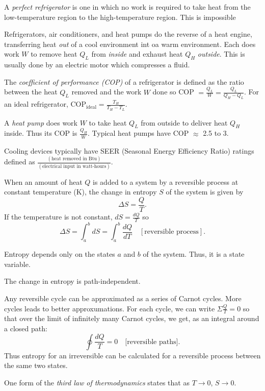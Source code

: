\begin{definition}
    A \emph{perfect refrigerator} is one in which no work is required to take heat from the low-temperature region to the high-temperature region. This is impossible
\end{definition}
\begin{remark}
    Refrigerators, air conditioners, and heat pumps do the reverse of a heat engine, transferring heat \emph{out} of a cool environment int oa warm environment. Each does work $W$ to remove heat $Q_L$ from \emph{inside} and exhaust heat $Q_H$ \emph{outside}. This is usually done by an electric motor which compresses a fluid.
\end{remark}
\begin{definition}
    The \emph{coefficient of performance (COP)} of a refrigerator is defined as the ratio between the heat $Q_L$ removed and the work $W$ done so COP $=\frac{Q_L}{W} = \frac{Q_L}{Q_H-Q_L}$. For an ideal refrigerator, $\text{COP}_{\text{ideal}} = \frac{T_H}{T_H-T_L}.$
\end{definition}
\begin{definition}
    A \emph{heat pump} does work $W$ to take heat $Q_L$ from outside to deliver heat $Q_H$ inside. Thus its COP is $\frac{Q_H}{W}$. Typical heat pumps have COP $\approx$ 2.5 to 3.
\end{definition}
\begin{remark}
    Cooling devices typically have SEER (Seasonal Energy Efficiency Ratio) ratings defined as $\frac{(\text{heat removed in Btu})}{(\text{electrical input in watt-hours})}$.
\end{remark}
\begin{definition}[Entropy]
    When an amount of heat $Q$ is added to a system by a reversible process at constant temperature (K), the change in entropy $S$ of the system is given by $$\Delta S= \frac{Q}{T}.$$ If the temperature is not constant, $dS = \frac{dQ}{T}$ so $$\Delta S = \int_a^b dS = \int_a^b \frac{dQ}{dT} \quad [\text{reversible process}].$$  
\end{definition}
\begin{definition}
    Entropy depends only on the states $a$ and $b$ of the system. Thus, it is a state variable.
\end{definition}
\begin{remark}
    The change in entropy is path-independent.
\end{remark}
\begin{remark}
    Any reversible cycle can be approximated as a series of Carnot cycles. More cycles leads to better approxumations. For each cycle, we can write $\Sigma\frac{Q}{T}=0$ so that over the limit of infinitely many Carnot cycles, we get, as an integral around a closed path: $$\oint\frac{dQ}{T}=0 \quad \text{[reversible paths]}.$$ Thus entropy for an irreversible can be calculated for a reversible process between the same two states.
\end{remark}
\begin{note}
    One form of the \emph{third law of thermodynamics} states that as $T \to 0$, $S \to 0$.
\end{note}

